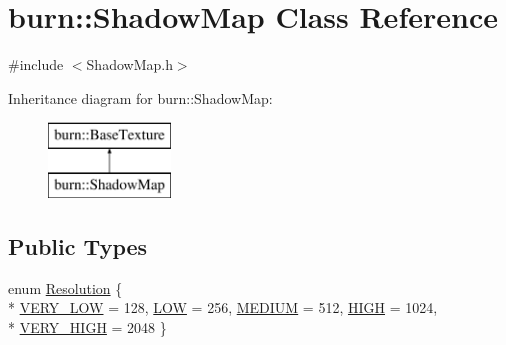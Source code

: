\hypertarget{classburn_1_1_shadow_map}{\section{burn\-:\-:Shadow\-Map Class Reference}
\label{classburn_1_1_shadow_map}
}


{\ttfamily \#include $<$Shadow\-Map.\-h$>$}

Inheritance diagram for burn\-:\-:Shadow\-Map\-:\begin{figure}[H]
\begin{center}
\leavevmode
\includegraphics[height=2.000000cm]{classburn_1_1_shadow_map}
\end{center}
\end{figure}
\subsection*{Public Types}
\begin{DoxyCompactItemize}
\item 
enum \hyperlink{classburn_1_1_shadow_map_a5bc770d75b5d4d1c8f755546d20266d1}{Resolution} \{ \\*
\hyperlink{classburn_1_1_shadow_map_a5bc770d75b5d4d1c8f755546d20266d1a17d1c1b7bfaa4110d50071a8dd7d303a}{V\-E\-R\-Y\-\_\-\-L\-O\-W} = 128, 
\hyperlink{classburn_1_1_shadow_map_a5bc770d75b5d4d1c8f755546d20266d1a018be58e430ad0d7a919b349f2940727}{L\-O\-W} = 256, 
\hyperlink{classburn_1_1_shadow_map_a5bc770d75b5d4d1c8f755546d20266d1a37e0bf0a3fa1cd16bbe7144d8ac9e169}{M\-E\-D\-I\-U\-M} = 512, 
\hyperlink{classburn_1_1_shadow_map_a5bc770d75b5d4d1c8f755546d20266d1a0f4c9ac68ca6faffa3ca9d7adeea6093}{H\-I\-G\-H} = 1024, 
\\*
\hyperlink{classburn_1_1_shadow_map_a5bc770d75b5d4d1c8f755546d20266d1a6efbce9ee6e8bb911e9558fd6f3b9ef2}{V\-E\-R\-Y\-\_\-\-H\-I\-G\-H} = 2048
 \}
\end{DoxyCompactItemize}
